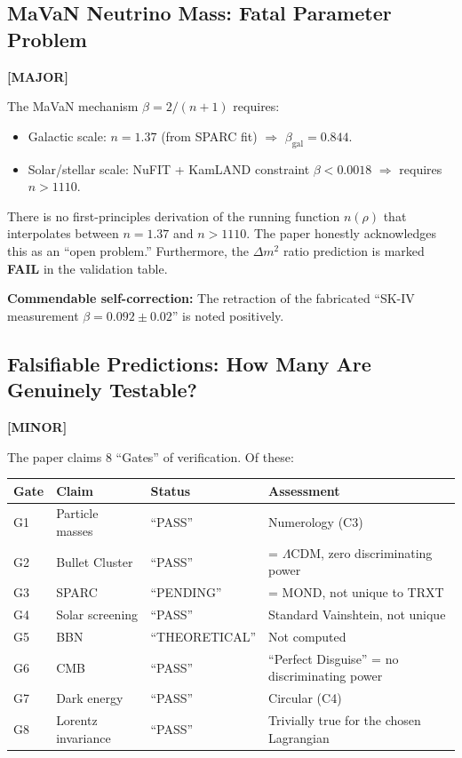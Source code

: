 \documentclass[12pt, a4paper]{article}
\newcommand{\major}{\textcolor{major}{\textbf{[MAJOR]}}}
\newcommand{\minor}{\textcolor{minor}{\textbf{[MINOR]}}}
\begin{document}
\subsection{MaVaN Neutrino Mass: Fatal Parameter Problem}
\major{}

The MaVaN mechanism $\beta = 2/(n+1)$ requires:
\begin{itemize}
    \item Galactic scale: $n = 1.37$ (from SPARC fit) $\Rightarrow$ $\beta_{\text{gal}} = 0.844$.
    \item Solar/stellar scale: NuFIT + KamLAND constraint $\beta < 0.0018$ $\Rightarrow$ requires $n > 1110$.
\end{itemize}

There is no first-principles derivation of the running function $n(\rho)$ that interpolates between $n = 1.37$ and $n > 1110$. The paper honestly acknowledges this as an ``open problem.'' Furthermore, the $\Delta m^2$ ratio prediction is marked \textbf{FAIL} in the validation table.

\textbf{Commendable self-correction:} The retraction of the fabricated ``SK-IV measurement $\beta = 0.092 \pm 0.02$'' is noted positively.

\subsection{Falsifiable Predictions: How Many Are Genuinely Testable?}
\minor{}

The paper claims 8 ``Gates'' of verification. Of these:
\begin{center}
\begin{tabular}{llll}
\toprule
Gate & Claim & Status & Assessment \\
\midrule
G1 & Particle masses & ``PASS'' & Numerology (C3) \\
G2 & Bullet Cluster & ``PASS'' & = $\Lambda$CDM, zero discriminating power \\
G3 & SPARC & ``PENDING'' & = MOND, not unique to TRXT \\
G4 & Solar screening & ``PASS'' & Standard Vainshtein, not unique \\
G5 & BBN & ``THEORETICAL'' & Not computed \\
G6 & CMB & ``PASS'' & ``Perfect Disguise'' = no discriminating power \\
G7 & Dark energy & ``PASS'' & Circular (C4) \\
G8 & Lorentz invariance & ``PASS'' & Trivially true for the chosen Lagrangian \\
\bottomrule
\end{tabular}
\end{center}
\end{document}
